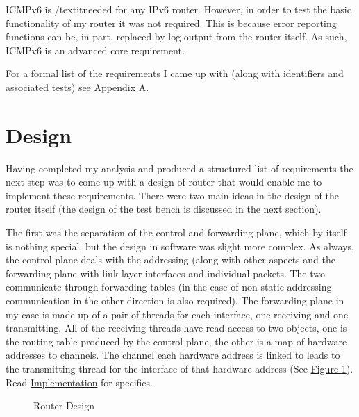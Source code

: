 \documentclass[12pt,a4paper,twoside,openright]{report}
\begin{document}
ICMPv6 is /textit{needed} for any IPv6 router.  However, in order to test the basic functionality of my router it was not required. This is because error reporting functions can be, in part, replaced by log output from the router itself. As such, ICMPv6 is an advanced core requirement.

\bigskip

For a formal list of the requirements I came up with (along with identifiers and associated tests) see \hyperref[appendix::requirements]{Appendix A}.

\section{Design}
\label{sec::design}

Having completed my analysis and produced a structured list of requirements the next step was to come up with a design of router that would enable me to implement these requirements.  There were two main ideas in the design of the router itself (the design of the test bench is discussed in the next section). 

\bigskip

The first was the separation of the control and forwarding plane, which by itself is nothing special, but the design in software was slight more complex.  As always, the control plane deals with the addressing (along with other aspects and the forwarding plane with link layer interfaces and individual packets.  The two communicate through forwarding tables (in the case of non static addressing communication in the other direction is also required). The forwarding plane in my case is made up of a pair of threads for each interface, one receiving and one transmitting. All of the receiving threads have read access to two objects, one is the routing table produced by the control plane, the other is a map of hardware addresses to channels.  The channel each hardware address is linked to leads to the transmitting thread for the interface of that hardware address (See \hyperref[fig::router_design]{Figure }\ref{fig::router_design}). Read \hyperref[chap::implementation]{Implementation} for specifics.

\begin{figure}
\centering
{}
\caption{Router Design}
\label{fig::router_design}
\end{figure}
\end{document}
